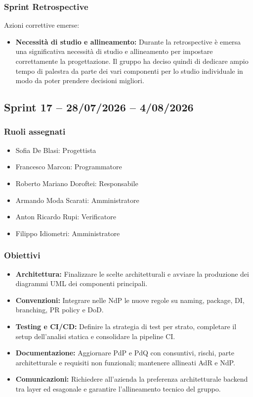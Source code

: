 \subsubsection{Sprint Retrospective}
Azioni correttive emerse:
\begin{itemize}
    \item \textbf{Necessità di studio e allineamento:} Durante la retrospective è emersa una significativa necessità di studio e allineamento per impostare correttamente la progettazione. Il gruppo ha deciso quindi di dedicare ampio tempo di palestra da parte dei vari componenti per lo studio individuale in modo da poter prendere decisioni migliori.
\end{itemize}

\subsection{Sprint 17 -- 28/07/2026 -- 4/08/2026}
\label{sec:sprint15}

\subsubsection{Ruoli assegnati}
\begin{itemize}
    \item Sofia De Blasi: Progettista 
    \item Francesco Marcon: Programmatore
    \item Roberto Mariano Doroftei: Responsabile
    \item Armando Moda Scarati: Amministratore
    \item Anton Ricardo Rupi: Verificatore
    \item Filippo Idiometri: Amministratore
\end{itemize}

\subsubsection{Obiettivi}
\begin{itemize}
    \item \textbf{Architettura:} Finalizzare le scelte architetturali e avviare la produzione dei diagrammi UML dei componenti principali.
    
    \item \textbf{Convenzioni:} Integrare nelle NdP le nuove regole su naming, package, DI, branching, PR policy e DoD.
    
    \item \textbf{Testing e CI/CD:} Definire la strategia di test per strato, completare il setup dell'analisi statica e consolidare la pipeline CI.
    
    \item \textbf{Documentazione:} Aggiornare PdP e PdQ con consuntivi, rischi, parte architetturale e requisiti non funzionali; mantenere allineati AdR e NdP.
    
    \item \textbf{Comunicazioni:} Richiedere all'azienda la preferenza architetturale backend tra layer ed esagonale e garantire l'allineamento tecnico del gruppo.
\end{itemize}

